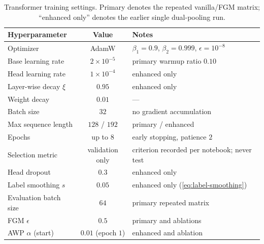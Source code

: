 \documentclass{ieeeaccess}
\begin{document}
\begin{table}[!t]
\centering
\caption{Transformer training settings. Primary denotes the repeated vanilla/FGM matrix; ``enhanced only'' denotes the earlier single dual-pooling run.}
\label{tab:hparams}
\footnotesize
\setlength{\tabcolsep}{2pt}
\begin{tabularx}{\columnwidth}{@{}lcX@{}}
\toprule
\textbf{Hyperparameter} & \textbf{Value} & \textbf{Notes} \\
\midrule
Optimizer & AdamW \cite{loshchilov2019adamw} & $\beta_1\!=\!0.9$, $\beta_2\!=\!0.999$, $\epsilon\!=\!10^{-8}$ \\
Base learning rate & $2\times 10^{-5}$ & primary warmup ratio $0.10$ \\
Head learning rate & $1\times 10^{-4}$ & enhanced only \\
Layer-wise decay $\xi$ & $0.95$ & enhanced only \\
Weight decay & $0.01$ & --- \\
Batch size & $32$ & no gradient accumulation \\
Max sequence length & $128$ / $192$ & primary / enhanced \\
Epochs & up to $8$ & early stopping, patience $2$ \\
Selection metric & validation only & criterion recorded per notebook; never test \\
Head dropout & $0.3$ & enhanced only \\
Label smoothing $s$ & $0.05$ & enhanced only (\cref{eq:label-smoothing}) \\
Evaluation batch size & $64$ & primary repeated matrix \\
FGM $\epsilon$ & $0.5$ & primary and ablations \\
AWP $\alpha$ (start) & $0.01$ (epoch $1$) & enhanced and ablation \\
\bottomrule
\end{tabularx}
\end{table}
\end{document}
